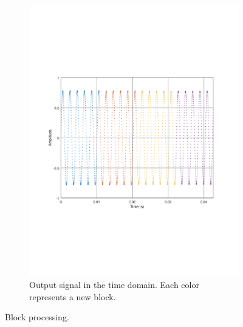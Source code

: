 \begin{figure}
\begin{subfigure}[t]{.49\textwidth}
		\includegraphics[width=.9\linewidth, clip, trim={2cm 7cm 2cm 7cm}]{gfx/Modelling/output.pdf}
		\caption{Output signal in the time domain. Each color represents a new block.}
		\label{fig:IFout2}
	\end{subfigure}
	\caption{Block processing.}
	\label{fig:IFoutput}
\end{figure}

\FloatBarrier